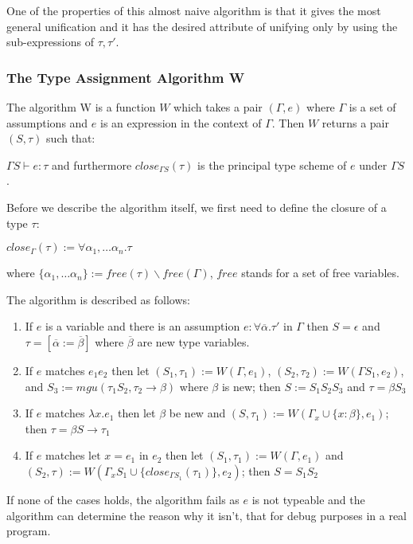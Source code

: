 One of the properties of this almost naive algorithm is that it gives the most general unification and it has the desired attribute of unifying only by using the sub-expressions of $\tau, \tau'$.

\subsubsection{The Type Assignment Algorithm W}

The algorithm W is a function $W$ which takes a pair $(\Gamma, e)$ where $\Gamma$ is a set of assumptions and $e$ is an expression in the context of $\Gamma$. Then $W$ returns a pair $(S, \tau)$ such that:

$\Gamma S \vdash e : \tau$ and furthermore $close_{\Gamma S}(\tau)$ is the principal type scheme of $e$ under $\Gamma S$.

Before we describe the algorithm itself, we first need to define the closure of a type $\tau$:

$close_\Gamma(\tau) := \forall \alpha_1, \dots \alpha_n . \tau$

where $\{\alpha_1, \dots \alpha_n\} := free(\tau) \backslash free(\Gamma)$, $free$ stands for a set of free variables. %

The algorithm is described as follows:

\begin{enumerate}
    \item If $e$ is a variable and there is an assumption $e : \forall \overline{\alpha} . \tau'$ in $\Gamma$ then $S = \epsilon$ and $\tau = [\overline{\alpha} := \overline{\beta}]$ where $\overline{\beta}$ are new type variables.
    \item If $e$ matches $e_1 e_2$ then let $(S_1, \tau_1) := W(\Gamma, e_1)$, $(S_2, \tau_2) := W(\Gamma S_1, e_2)$, and $S_3 := mgu (\tau_1 S_2, \tau_2 \rightarrow \beta)$ where $\beta$ is new; then $S := S_1 S_2 S_3$ and $\tau = \beta S_3$
    \item If $e$ matches $\lambda x . e_1$ then let $\beta$ be new and $(S, \tau_1) := W(\Gamma_x \cup \{x : \beta\}, e_1)$; then $\tau = \beta S \rightarrow \tau_1$
    \item If $e$ matches $\text{let } x = e_1 \text{ in } e_2$ then let $(S_1, \tau_1) := W(\Gamma, e_1)$ and $(S_2, \tau) := W(\Gamma_x S_1 \cup \{close_{\Gamma S_1}(\tau_1)\}, e_2)$; then $S = S_1 S_2$
\end{enumerate}

If none of the cases holds, the algorithm fails as $e$ is not typeable and the algorithm can determine the reason why it isn't, that for debug purposes in a real program. %

